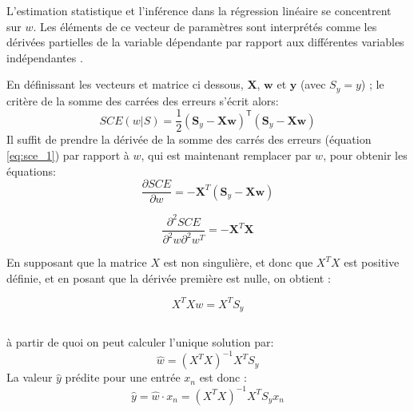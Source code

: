 	
	L'estimation statistique et l'inférence dans la régression linéaire se concentrent sur $w$. Les éléments de ce vecteur de paramètres sont interprétés comme les dérivées partielles de la variable dépendante par rapport aux différentes variables indépendantes \cite{darlington2016regression}.
	
	En définissant les vecteurs  et matrice ci dessous, ${\boldsymbol X}$, ${\boldsymbol w}$ et ${\boldsymbol y}$ (avec ${S_y = y}$) \cite{antoine2018apprentissage}; le critère de la somme des carrées des erreurs s'écrit alors:
	\begin{equation}\label{eq:sce_2}
	SCE(w|\mathit{S}) = \frac{1}{2} ({\boldsymbol S_y }- \mathbf{X}\boldsymbol w)^{\mathsf{T}}({ \boldsymbol S_y }- \mathbf{X} \boldsymbol w)
	\end{equation}  
	Il suffit de prendre la dérivée de la somme des carrés des erreurs (équation \ref{eq:sce_1}) par rapport à $w$, qui est maintenant remplacer par $w$, pour obtenir les équations: 
	$$
	\frac{\partial SCE}{\partial w} = -{\boldsymbol X}^T({\boldsymbol S_y }- \mathbf{X} \boldsymbol w)
	$$
	
	$$
	\frac{\partial^2 SCE}{\partial^2 w \partial^2 w^T} = -{\boldsymbol X}^T{\boldsymbol X}
	$$
	
	En supposant que la matrice $X$ est non singulière, et donc que $X^TX$ est positive définie, et en posant que la dérivée première est nulle, on obtient :
	
	
	\begin{equation}
	{X^{T} Xw =  X^{T} S_y}
	\end{equation}
	\begin{tabular}{lr}
		
	\end{tabular}
	
	à partir de quoi on peut calculer l'unique solution par: 
	\begin{equation}
	\hat{w} = {(X^{T} X)^{-1} X^{T} S_y}
	\end{equation}
	La valeur $\hat{y}$ prédite pour une entrée $x_n$ est donc : 
	$$
	\hat{y} = \hat{w}\cdot x_n = {(X^{T} X)^{-1} X^{T} S_y}x_n 
	$$ 
	
	
	
